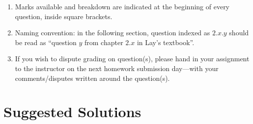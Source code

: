 \documentclass{amsart}
\theoremstyle{definition}
\theoremstyle{definition}
\DeclareMathOperator{\1}{\mathbbm{1}}
\begin{document}
\begin{enumerate}[itemsep=.75em]
		\item Marks available and breakdown are indicated at the beginning of every question, inside square brackets. 
		
		\item Naming convention: in the following section, question indexed as $2.x.y$ should be read as ``question $y$ from chapter $2.x$ in Lay's textbook''.
		
		\item If you wish to dispute grading on question(s), please hand in your assignment to the instructor on the next homework submission day---with your comments/disputes written around the question(s).
		
	\end{enumerate}
	
	
	
	\clearpage
	
	\section*{Suggested Solutions}
	
	\bigskip
	
\end{document}
